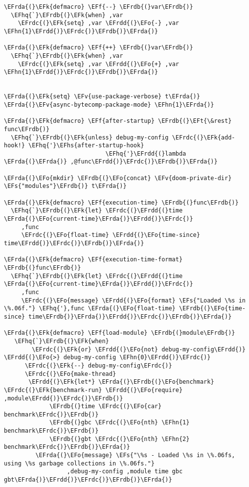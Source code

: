 \documentclass[a4wide,10pt]{article}
\newcommand{\EFs}[1]{\textcolor{EFs}{#1}} %
\newcommand{\EFk}[1]{\textcolor{EFk}{#1}} %
\newcommand{\EFf}[1]{\textcolor{EFf}{#1}} %
\newcommand{\EFv}[1]{\textcolor{EFv}{#1}} %
\newcommand{\EFt}[1]{\textcolor{EFt}{#1}} %
\newcommand{\EFo}[1]{\textcolor{EFo}{#1}} %
\newcommand{\EFhn}[1]{\textcolor{EFhn}{\textbf{#1}}} %
\newcommand{\EFhq}[1]{\textcolor{EFhq}{#1}} %
\newcommand{\EFhs}[1]{\textcolor{EFhs}{#1}} %
\newcommand{\EFrda}[1]{\textcolor{EFrda}{#1}} %
\newcommand{\EFrdb}[1]{\textcolor{EFrdb}{#1}} %
\newcommand{\EFrdc}[1]{\textcolor{EFrdc}{#1}} %
\newcommand{\EFrdd}[1]{\textcolor{EFrdd}{#1}} %
\begin{document}
\begin{Code}
\begin{Verbatim}
\EFrda{(}\EFk{defmacro} \EFf{--} \EFrdb{(}var\EFrdb{)}
  \EFhq{`}\EFrdb{(}\EFk{when} ,var
    \EFrdc{(}\EFk{setq} ,var \EFrdd{(}\EFo{-} ,var \EFhn{1}\EFrdd{)}\EFrdc{)}\EFrdb{)}\EFrda{)}

\EFrda{(}\EFk{defmacro} \EFf{++} \EFrdb{(}var\EFrdb{)}
  \EFhq{`}\EFrdb{(}\EFk{when} ,var
    \EFrdc{(}\EFk{setq} ,var \EFrdd{(}\EFo{+} ,var \EFhn{1}\EFrdd{)}\EFrdc{)}\EFrdb{)}\EFrda{)}


\EFrda{(}\EFk{setq} \EFv{use-package-verbose} t\EFrda{)}
\EFrda{(}\EFv{async-bytecomp-package-mode} \EFhn{1}\EFrda{)}

\EFrda{(}\EFk{defmacro} \EFf{after-startup} \EFrdb{(}\EFt{\&rest} func\EFrdb{)}
  \EFhq{`}\EFrdb{(}\EFk{unless} debug-my-config \EFrdc{(}\EFk{add-hook!} \EFhq{'}\EFhs{after-startup-hook}
                             \EFhq{'}\EFrdd{(}lambda \EFrda{(}\EFrda{)} ,@func\EFrdd{)}\EFrdc{)}\EFrdb{)}\EFrda{)}

\EFrda{(}\EFo{mkdir} \EFrdb{(}\EFo{concat} \EFv{doom-private-dir} \EFs{"modules"}\EFrdb{)} t\EFrda{)}

\EFrda{(}\EFk{defmacro} \EFf{execution-time} \EFrdb{(}func\EFrdb{)}
  \EFhq{`}\EFrdb{(}\EFk{let} \EFrdc{(}\EFrdd{(}time \EFrda{(}\EFo{current-time}\EFrda{)}\EFrdd{)}\EFrdc{)}
     ,func
     \EFrdc{(}\EFo{float-time} \EFrdd{(}\EFo{time-since} time\EFrdd{)}\EFrdc{)}\EFrdb{)}\EFrda{)}

\EFrda{(}\EFk{defmacro} \EFf{execution-time-format} \EFrdb{(}func\EFrdb{)}
  \EFhq{`}\EFrdb{(}\EFk{let} \EFrdc{(}\EFrdd{(}time \EFrda{(}\EFo{current-time}\EFrda{)}\EFrdd{)}\EFrdc{)}
     ,func
     \EFrdc{(}\EFo{message} \EFrdd{(}\EFo{format} \EFs{"Loaded \%s in \%.06f."} \EFhq{'},func \EFrda{(}\EFo{float-time} \EFrdb{(}\EFo{time-since} time\EFrdb{)}\EFrda{)}\EFrdd{)}\EFrdc{)}\EFrdb{)}\EFrda{)}

\EFrda{(}\EFk{defmacro} \EFf{load-module} \EFrdb{(}module\EFrdb{)}
   \EFhq{`}\EFrdb{(}\EFk{when}
        \EFrdc{(}\EFk{or} \EFrdd{(}\EFo{not} debug-my-config\EFrdd{)} \EFrdd{(}\EFo{>} debug-my-config \EFhn{0}\EFrdd{)}\EFrdc{)}
      \EFrdc{(}\EFk{--} debug-my-config\EFrdc{)}
      \EFrdc{(}\EFo{make-thread}
       \EFrdd{(}\EFk{let*} \EFrda{(}\EFrdb{(}\EFo{benchmark} \EFrdc{(}\EFk{benchmark-run} \EFrdd{(}\EFo{require} ,module\EFrdd{)}\EFrdc{)}\EFrdb{)}
             \EFrdb{(}time \EFrdc{(}\EFo{car} benchmark\EFrdc{)}\EFrdb{)}
             \EFrdb{(}gbc \EFrdc{(}\EFo{nth} \EFhn{1} benchmark\EFrdc{)}\EFrdb{)}
             \EFrdb{(}gbt \EFrdc{(}\EFo{nth} \EFhn{2} benchmark\EFrdc{)}\EFrdb{)}\EFrda{)}
         \EFrda{(}\EFo{message} \EFs{"\%s - Loaded \%s in \%.06fs, using \%s garbage collections in \%.06fs."}
                  ,debug-my-config ,module time gbc gbt\EFrda{)}\EFrdd{)}\EFrdc{)}\EFrdb{)}\EFrda{)}


\end{Verbatim}
\end{Code}
\end{document}
